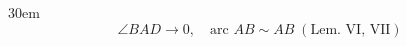 \documentclass[border=4pt]{standalone}
\begin{document}
\begin{varwidth}{30em}
\large
\[ \angle BAD \to 0,\quad \text{arc } AB \sim AB \;(\text{Lem. VI, VII}) \]

\end{varwidth}
\end{document}
